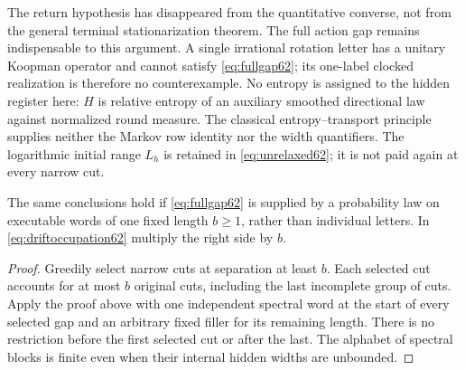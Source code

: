 \begin{remark}\label{rem:gapboundary62}
The return hypothesis has disappeared from the quantitative converse,
not from the general terminal stationarization theorem. The full action
gap remains indispensable to this argument. A single irrational rotation
letter has a unitary Koopman operator and cannot satisfy
\eqref{eq:fullgap62}; its one-label clocked realization is therefore no
counterexample. No entropy is assigned to the hidden register here:
$H$ is relative entropy of an auxiliary smoothed directional law against
normalized round measure. The classical entropy--transport principle
\cite{PW61} supplies neither the Markov row identity nor the width
quantifiers. The logarithmic initial range $L_h$ is retained in
\eqref{eq:unrelaxed62}; it is not paid again at every narrow cut.
\end{remark}

\begin{corollary}\label{cor:blockgap62}
The same conclusions hold if \eqref{eq:fullgap62} is supplied by a
probability law on executable words of one fixed length $b\ge1$, rather
than individual letters. In \eqref{eq:driftoccupation62} multiply the
right side by $b$.
\end{corollary}
\begin{proof}
Greedily select narrow cuts at separation at least $b$. Each selected
cut accounts for at most $b$ original cuts, including the last incomplete
group of cuts. Apply the proof above with one independent spectral word
at the start of every selected gap and an arbitrary fixed filler for its
remaining length. There is no restriction before the first selected cut
or after the last. The alphabet of spectral blocks is finite even when
their internal hidden widths are unbounded.
\end{proof}

